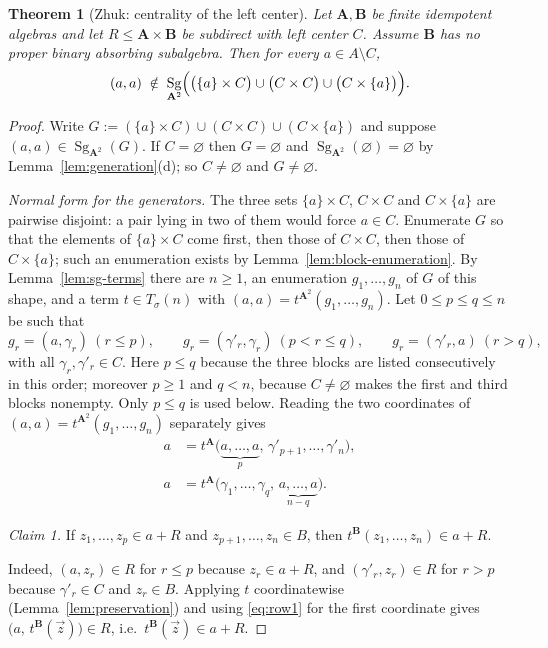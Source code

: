 \documentclass[11pt]{article}
\theoremstyle{mainplain}
\newtheorem{theorem}{Theorem}[section]
\theoremstyle{mainroman}
\theoremstyle{definition}
\numberwithin{equation}{section}
\DeclareMathOperator{\Sg}{Sg}
\newcommand{\bA}{\mathbf A}
\newcommand{\bB}{\mathbf B}
\newcommand{\Tm}{T_\sigma}
\begin{document}
\begin{theorem}[Zhuk: centrality of the left center]\label{thm:center-central}
Let $\bA,\bB$ be finite idempotent algebras and let $R\le\bA\times\bB$ be
subdirect with left center $C$. Assume $\bB$ has no proper binary absorbing
subalgebra. Then for every $a\in A\setminus C$,
\[
 (a,a)\;\notin\;\Sg_{\bA^2}\Bigl(\bigl(\{a\}\times C\bigr)\cup\bigl(C\times C\bigr)\cup\bigl(C\times\{a\}\bigr)\Bigr).
\]
\end{theorem}
\begin{proof}
Write $G:=(\{a\}\times C)\cup(C\times C)\cup(C\times\{a\})$ and suppose
$(a,a)\in\Sg_{\bA^2}(G)$. If $C=\varnothing$ then $G=\varnothing$ and
$\Sg_{\bA^2}(\varnothing)=\varnothing$ by Lemma~\ref{lem:generation}(d);
so $C\ne\varnothing$ and $G\ne\varnothing$.

\emph{Normal form for the generators.} The three sets $\{a\}\times C$,
$C\times C$ and $C\times\{a\}$ are pairwise disjoint: a pair lying in two of
them would force $a\in C$. Enumerate $G$ so that the elements of
$\{a\}\times C$ come first, then those of $C\times C$, then those of
$C\times\{a\}$; such an enumeration exists by
Lemma~\ref{lem:block-enumeration}. By Lemma~\ref{lem:sg-terms} there are
$n\ge1$, an enumeration $g_1,\dots,g_n$ of $G$ of this shape, and a term
$t\in\Tm(n)$ with $(a,a)=t^{\bA^2}(g_1,\dots,g_n)$. Let $0\le p\le q\le n$ be
such that
\[
 g_r=(a,\gamma_r)\ (r\le p),\qquad
 g_r=(\gamma'_r,\gamma_r)\ (p<r\le q),\qquad
 g_r=(\gamma'_r,a)\ (r>q),
\]
with all $\gamma_r,\gamma'_r\in C$. Here $p\le q$ because the three blocks are
listed consecutively in this order; moreover $p\ge1$ and $q<n$, because
$C\ne\varnothing$ makes the first and third blocks nonempty. Only $p\le q$ is
used below. Reading the two coordinates of
$(a,a)=t^{\bA^2}(g_1,\dots,g_n)$ separately gives
\begin{align}
 a&=t^{\bA}\bigl(\underbrace{a,\dots,a}_{p},\,\gamma'_{p+1},\dots,\gamma'_{n}\bigr),
   \label{eq:row1}\\
 a&=t^{\bA}\bigl(\gamma_{1},\dots,\gamma_{q},\,\underbrace{a,\dots,a}_{n-q}\bigr).
   \label{eq:row2}
\end{align}

\emph{Claim 1.} If $z_1,\dots,z_p\in a+R$ and $z_{p+1},\dots,z_n\in B$, then
$t^{\bB}(z_1,\dots,z_n)\in a+R$.

Indeed, $(a,z_r)\in R$ for $r\le p$ because $z_r\in a+R$, and
$(\gamma'_r,z_r)\in R$ for $r>p$ because $\gamma'_r\in C$ and $z_r\in B$.
Applying $t$ coordinatewise (Lemma~\ref{lem:preservation}) and using
\eqref{eq:row1} for the first coordinate gives
$\bigl(a,\,t^{\bB}(\vec z)\bigr)\in R$, i.e.\ $t^{\bB}(\vec z)\in a+R$.


\end{proof}
\end{document}
